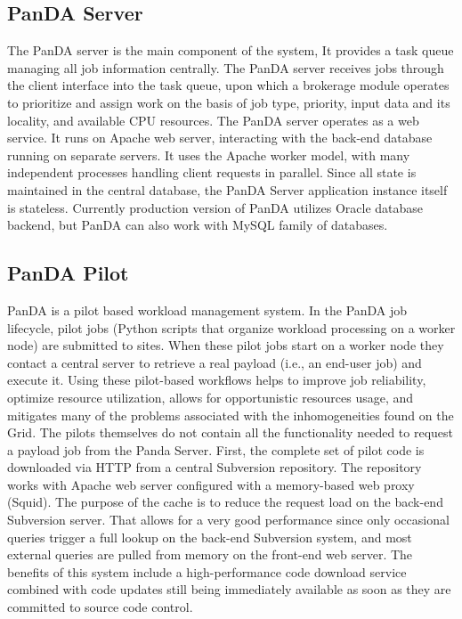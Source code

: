 \documentclass[10pt, conference, compsocconf]{IEEEtran}
\begin{document}
\subsection{PanDA Server}
The PanDA server is the main component of the system, It provides  a task queue managing all job information centrally. The PanDA  server receives jobs through the client interface into the task queue, upon which a brokerage module  operates to prioritize  and assign work on the basis of job type, priority, input data and its locality, and available CPU resources. The PanDA  server operates as a web service. It runs on Apache web server, interacting with the back-end database running  on separate servers. It uses the Apache worker  model, with many independent   processes  handling client requests  in  parallel. Since all  state is maintained  in  the central database,  the PanDA Server application instance itself is stateless. Currently production version of PanDA utilizes Oracle database backend, but PanDA  can also work with MySQL family of databases.

\subsection{PanDA Pilot}
 PanDA is a pilot based workload  management system. In the PanDA job lifecycle, pilot jobs (Python scripts that organize workload processing on a worker  node) are submitted to sites. When these  pilot jobs start on a  worker node they contact a central  server  to retrieve  a real payload (i.e., an end-user job) and execute it. Using these pilot-based  workflows helps to improve job reliability, optimize resource utilization, allows for opportunistic  resources usage, and mitigates  many of the problems  associated with the inhomogeneities found on the Grid.
The pilots themselves  do not contain all the functionality needed to request a payload  job from the Panda Server. First, the complete  set of pilot code is downloaded via HTTP from a  central Subversion repository.  The repository works with Apache web server configured  with a  memory-based   web proxy (Squid). The purpose  of the cache  is to reduce  the request load on the back-end Subversion  server. That allows for a  very good performance since only occasional  queries trigger a  full  lookup on the back-end  Subversion  system, and most external  queries are pulled from memory on the front-end web server. The benefits of this system include a high-performance code download service combined with code updates still being immediately  available  as soon as they are committed to source code control.
\end{document}

